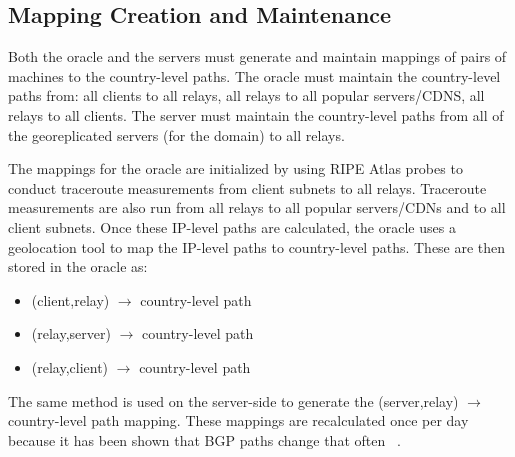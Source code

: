 \subsection{Mapping Creation and Maintenance}
\label{maps}

Both the oracle and the servers must generate and maintain mappings of pairs of machines to the country-level paths.  The oracle must maintain the country-level paths from: all clients to all relays, all relays to all popular servers/CDNS, all relays to all clients.  The server must maintain the country-level paths from all of the georeplicated servers (for the domain) to all relays.  

The mappings for the oracle are initialized by using RIPE Atlas probes to conduct traceroute measurements from client subnets to all relays.  Traceroute measurements are also run from all relays to all popular servers/CDNs and to all client subnets.  Once these IP-level paths are calculated, the oracle uses a geolocation tool to map the IP-level paths to country-level paths.  These are then stored in the oracle as:

\begin{itemize}
\item (client,relay) $\rightarrow$ country-level path
\item (relay,server) $\rightarrow$ country-level path
\item (relay,client) $\rightarrow$ country-level path
\end{itemize}

The same method is used on the server-side to generate the (server,relay) $\rightarrow$ country-level path mapping.  These mappings are recalculated once per day because it has been shown that BGP paths change that often~\cite{} .
